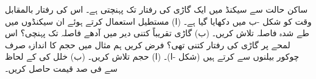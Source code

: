ساکن حالت سے  سیکنڈ میں ایک گاڑی  کی رفتار تک پہنچتی ہے۔ اس کی رفتار بالمقابل وقت کو شکل -ب میں دکھایا گیا ہے۔ (ا) مستطیل استعمال کرتے ہوئے ان  سیکنڈوں میں طے شدہ فاصلہ تلاش کریں۔ (ب)  گاڑی تقریباً کتنی دیر میں آدھے فاصلہ تک پہنچی؟  اس لمحے پر گاڑی کی رفتار کتنی تھی؟
فرض کریں ہم مثال  میں حجم کا اندازہ صرف  چوکور بیلنوں سے کرتے ہیں (شکل -ا)۔ (ا) حجم  تلاش کریں۔ (ب) خلل   کی  کے لحاظ سے فی صد قیمت حاصل کریں۔\\
